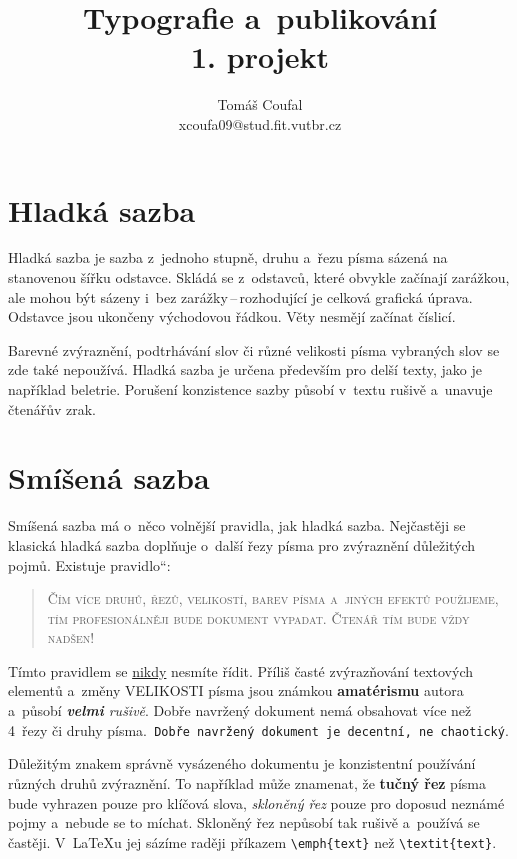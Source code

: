 \documentclass[a4paper, 11pt, twocolumn]{article}
\begin{document}
\newcommand{\uvcz}[1]{\quotedblbase #1\textquotedblleft}
\title{Typografie a~publikování \\ 1. projekt}
\author{Tomáš Coufal \\ xcoufa09@stud.fit.vutbr.cz}
\date{}
\maketitle

\section{Hladká sazba}

Hladká sazba je sazba z~jednoho stupně, druhu a~řezu písma sázená na stanovenou šířku odstavce. Skládá se z~odstavců, které obvykle začínají zarážkou, ale mohou být sázeny i~bez zarážky\,--\,rozhodující je celková grafická úprava. Odstavce jsou ukončeny východovou řádkou. Věty nesmějí začínat číslicí.

Barevné zvýraznění, podtrhávání slov či různé velikosti písma vybraných slov se zde také nepoužívá. Hladká sazba je určena především pro delší texty, jako je například beletrie. Porušení konzistence sazby působí v~textu rušivě a~unavuje čtenářův zrak.

\section{Smíšená sazba}

Smíšená sazba má o~něco volnější pravidla, jak hladká sazba. Nejčastěji se klasická hladká sazba doplňuje o~další řezy písma pro zvýraznění důležitých pojmů. Existuje \uvcz{pravidlo}:

\begin{quotation}
\textsc{Čím více druhů, řezů, velikostí, barev písma a~jiných efektů použijeme, tím profesionálněji bude dokument vypadat. Čtenář tím bude vždy nadšen!}
\end{quotation}

Tímto pravidlem se \underline{nikdy} nesmíte řídit. Příliš časté zvýrazňování textových elementů a~změny {\huge V}{\LARGE E}{\Large L}{\large I}{\normalsize K}{\small O}{\footnotesize S}{\scriptsize T}{\tiny I} písma {\Large jsou} {\LARGE známkou} \textbf{\huge amatérismu} autora a~působí \emph{\textbf{velmi} rušivě}. Dobře navržený dokument nemá obsahovat více než 4~řezy či druhy písma.\texttt{ Dobře navržený dokument je decentní, ne chaotický}.

Důležitým znakem správně vysázeného dokumentu je konzistentní používání různých druhů zvýraznění. To například může znamenat, že \textbf{tučný řez} písma bude vyhrazen pouze pro klíčová slova, \emph{skloněný řez} pouze pro doposud neznámé pojmy a~nebude se to míchat. Skloněný řez nepůsobí tak rušivě a~používá se častěji. V~{\LaTeX}u jej sázíme raději příkazem \verb|\emph{text}| než \verb|\textit{text}|.
\end{document}

